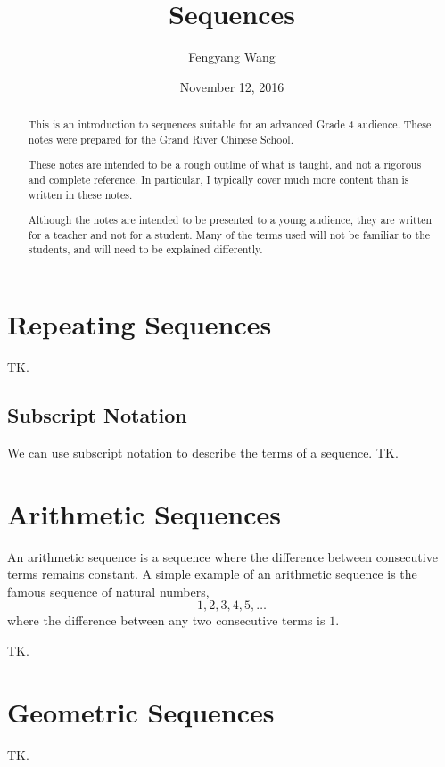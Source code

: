 \documentclass[a4paper,10pt]{report}
\title{Sequences}
\author{Fengyang Wang}
\date{November 12, 2016}
\begin{document}
\begin{abstract}

This is an introduction to sequences suitable for an advanced Grade 4 audience.
These notes were prepared for the Grand River Chinese School.

These notes are intended to be a rough outline of what is taught, and not a
rigorous and complete reference. In particular, I typically cover much more
content than is written in these notes.

Although the notes are intended to be presented to a young audience, they are
written for a teacher and not for a student. Many of the terms used will not be
familiar to the students, and will need to be explained differently.

\end{abstract}

\maketitle

\tableofcontents

\chapter{Repeating Sequences}

TK.

\section{Subscript Notation}

We can use subscript notation to describe the terms of a sequence. TK.

\chapter{Arithmetic Sequences}

An arithmetic sequence is a sequence where the difference between consecutive
terms remains constant. A simple example of an arithmetic sequence is the
famous sequence of natural numbers, \[
  1, 2, 3, 4, 5, \dots
\] where the difference between any two consecutive terms is \(1\).

TK.

\chapter{Geometric Sequences}

TK.
\end{document}
